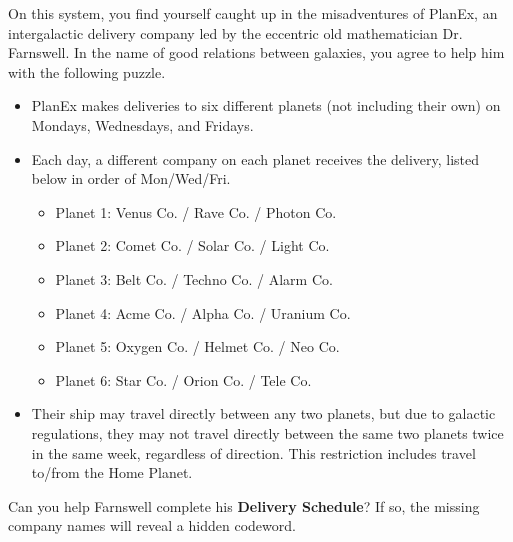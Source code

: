 On this system, you find yourself caught up in the misadventures of
PlanEx, an
intergalactic delivery company led by the eccentric old mathematician
Dr. Farnswell. In the name of good relations between galaxies, you
agree to help him with the following puzzle. 

\begin{itemize}
\item PlanEx makes deliveries
to six different planets (not including their own) on Mondays, Wednesdays,
and Fridays. 
\item Each day, a different company on each planet receives the
delivery, listed below in order of Mon/Wed/Fri.
\begin{itemize}
\item Planet 1: Venus Co. / Rave Co. / Photon Co.
\item Planet 2: Comet Co. / Solar Co. / Light Co.
\item Planet 3: Belt Co. / Techno Co. / Alarm Co.
\item Planet 4: Acme Co. / Alpha Co. / Uranium Co.
\item Planet 5: Oxygen Co. / Helmet Co. / Neo Co.
\item Planet 6: Star Co. / Orion Co. / Tele Co.
\end{itemize}
\item Their ship may travel directly between any two planets,
  but due to galactic regulations, they may not travel directly
  between the same two planets twice in the same week, regardless
  of direction. This restriction includes travel to/from the Home Planet.
\end{itemize}

Can you help Farnswell complete his \textbf{Delivery Schedule}? If so,
the missing company names will reveal a hidden codeword. 

\begin{center}
\end{center} 
